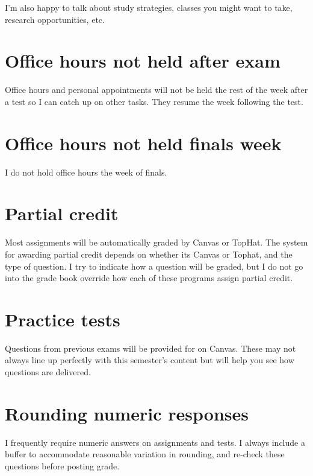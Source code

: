 \documentclass[
]{book}
\begin{document}
I'm also happy to talk about study strategies, classes you might want to take, research opportunities, etc.

\hypertarget{office-hours-not-held-after-exam}{%
\chapter{Office hours not held after exam}\label{office-hours-not-held-after-exam}}

Office hours and personal appointments will not be held the rest of the week after a test so I can catch up on other tasks. They resume the week following the test.

\hypertarget{office-hours-not-held-finals-week}{%
\chapter{Office hours not held finals week}\label{office-hours-not-held-finals-week}}

I do not hold office hours the week of finals.

\hypertarget{partial-credit}{%
\chapter{Partial credit}\label{partial-credit}}

Most assignments will be automatically graded by Canvas or TopHat. The system for awarding partial credit depends on whether its Canvas or Tophat, and the type of question. I try to indicate how a question will be graded, but I do not go into the grade book override how each of these programs assign partial credit.

\hypertarget{practice-tests}{%
\chapter{Practice tests}\label{practice-tests}}

Questions from previous exams will be provided for on Canvas. These may not always line up perfectly with this semester's content but will help you see how questions are delivered.

\hypertarget{rounding-numeric-responses}{%
\chapter{Rounding numeric responses}\label{rounding-numeric-responses}}

I frequently require numeric answers on assignments and tests. I always include a buffer to accommodate reasonable variation in rounding, and re-check these questions before posting grade.
\end{document}

